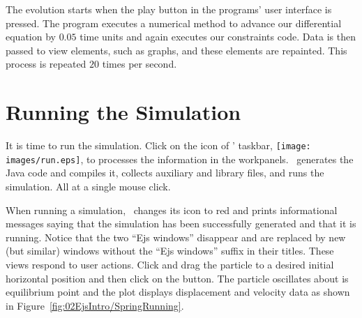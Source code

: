 The evolution starts when the play button in the programs' user interface is pressed. The program executes a numerical method to advance our differential equation by $0.05$ time units and again executes our constraints code.  Data is then passed to view elements, such as graphs, and these elements are repainted. This process is repeated $20$ times per second.

\section{Running the Simulation}\label{section:02Running}

It is time to run the simulation. Click on the  icon of \ejs' taskbar, \texttt{[image: images/run.eps]}, to processes the information in the workpanels.  \Ejs\ generates the Java code and compiles it, collects auxiliary and library files, and runs the simulation. All at a single mouse click.

When running a simulation, \ejs\ changes its  icon to red and prints informational messages saying that the simulation has been successfully generated and that it is running. Notice that the two ``Ejs windows'' disappear and are replaced by new (but similar) windows without the ``Ejs windows'' suffix in their titles.  These views respond to user actions. Click and drag the particle to a desired initial horizontal position and then click on the  button. The particle oscillates about is equilibrium point and the plot displays displacement and velocity data as shown in Figure~\ref{fig:02EjsIntro/SpringRunning}.

